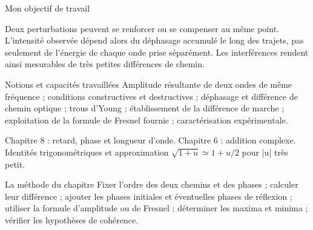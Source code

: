 \thispagestyle{mpsiFront}
\begin{docu}{Mon objectif de travail}\end{docu}

Deux perturbations peuvent se renforcer ou se compenser au même point. L’intensité observée dépend alors du déphasage accumulé le long des trajets, pas seulement de l’énergie de chaque onde prise séparément. Les interférences rendent ainsi mesurables de très petites différences de chemin.
\begin{loi}{Notions et capacités travaillées}
Amplitude résultante de deux ondes de même fréquence ; conditions constructives et destructives ; déphasage et différence de chemin optique ; trous d’Young ; établissement de la différence de marche ; exploitation de la formule de Fresnel fournie ; caractérisation expérimentale.
\end{loi}

Chapitre 8 : retard, phase et longueur d’onde. Chapitre 6 : addition complexe. Identités trigonométriques et approximation $\sqrt{1+u}\simeq1+u/2$ pour |u| très petit.

\begin{methode}{La méthode du chapitre}
Fixer l’ordre des deux chemins et des phases ; calculer leur différence ; ajouter les phases initiales et éventuelles phases de réflexion ; utiliser la formule d’amplitude ou de Fresnel ; déterminer les maxima et minima ; vérifier les hypothèses de cohérence.
\end{methode}

